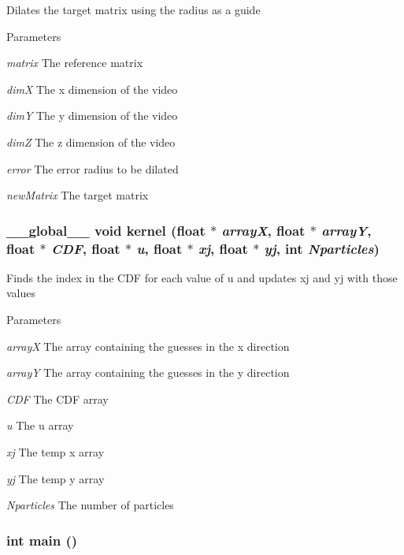 \label{ex__particle__CUDA__naive__full_8cu_a707e839d9152f9bf820dee64c6627f5b}
Dilates the target matrix using the radius as a guide 
\begin{DoxyParams}{Parameters}
\item[{\em matrix}]The reference matrix \item[{\em dimX}]The x dimension of the video \item[{\em dimY}]The y dimension of the video \item[{\em dimZ}]The z dimension of the video \item[{\em error}]The error radius to be dilated \item[{\em newMatrix}]The target matrix \end{DoxyParams}
\hypertarget{ex__particle__CUDA__naive__full_8cu_a13c2e7691b5ac6748868aa438850e0b1}{
\subsubsection[{kernel}]{\setlength{\rightskip}{0pt plus 5cm}\_\-\_\-global\_\-\_\- void kernel (float $\ast$ {\em arrayX}, \/  float $\ast$ {\em arrayY}, \/  float $\ast$ {\em CDF}, \/  float $\ast$ {\em u}, \/  float $\ast$ {\em xj}, \/  float $\ast$ {\em yj}, \/  int {\em Nparticles})}}
\label{ex__particle__CUDA__naive__full_8cu_a13c2e7691b5ac6748868aa438850e0b1}
Finds the index in the CDF for each value of u and updates xj and yj with those values 
\begin{DoxyParams}{Parameters}
\item[{\em arrayX}]The array containing the guesses in the x direction \item[{\em arrayY}]The array containing the guesses in the y direction \item[{\em CDF}]The CDF array \item[{\em u}]The u array \item[{\em xj}]The temp x array \item[{\em yj}]The temp y array \item[{\em Nparticles}]The number of particles \end{DoxyParams}
\hypertarget{ex__particle__CUDA__naive__full_8cu_ae66f6b31b5ad750f1fe042a706a4e3d4}{
\subsubsection[{main}]{\setlength{\rightskip}{0pt plus 5cm}int main ()}}
